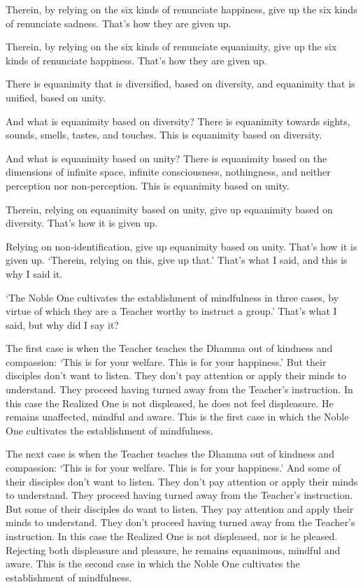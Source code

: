 \documentclass[12pt,openany]{book}%
\begin{document}
Therein, by relying on the six kinds of renunciate happiness, give up the six kinds of renunciate sadness. That’s how they are given up. 

Therein, by relying on the six kinds of renunciate equanimity, give up the six kinds of renunciate happiness. That’s how they are given up. 

There is equanimity that is diversified, based on diversity, and equanimity that is unified, based on unity. 

And what is equanimity based on diversity? There is equanimity towards sights, sounds, smells, tastes, and touches. This is equanimity based on diversity. 

And what is equanimity based on unity? There is equanimity based on the dimensions of infinite space, infinite consciousness, nothingness, and neither perception nor non-perception. This is equanimity based on unity. 

Therein, relying on equanimity based on unity, give up equanimity based on diversity. That’s how it is given up. 

Relying on non-identification, give up equanimity based on unity. That’s how it is given up. ‘Therein, relying on this, give up that.’ That’s what I said, and this is why I said it. 

‘The Noble One cultivates the establishment of mindfulness in three cases, by virtue of which they are a Teacher worthy to instruct a group.’ That’s what I said, but why did I say it? 

The first case is when the Teacher teaches the Dhamma out of kindness and compassion: ‘This is for your welfare. This is for your happiness.’ But their disciples don’t want to listen. They don’t pay attention or apply their minds to understand. They proceed having turned away from the Teacher’s instruction. In this case the Realized One is not displeased, he does not feel displeasure. He remains unaffected, mindful and aware. This is the first case in which the Noble One cultivates the establishment of mindfulness. 

The next case is when the Teacher teaches the Dhamma out of kindness and compassion: ‘This is for your welfare. This is for your happiness.’ And some of their disciples don’t want to listen. They don’t pay attention or apply their minds to understand. They proceed having turned away from the Teacher’s instruction. But some of their disciples do want to listen. They pay attention and apply their minds to understand. They don’t proceed having turned away from the Teacher’s instruction. In this case the Realized One is not displeased, nor is he pleased. Rejecting both displeasure and pleasure, he remains equanimous, mindful and aware. This is the second case in which the Noble One cultivates the establishment of mindfulness. 
\end{document}
